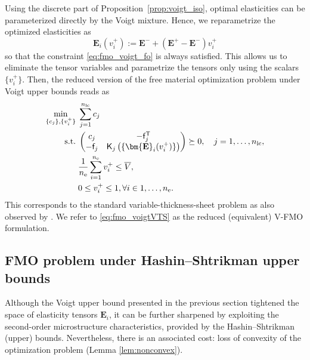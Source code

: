\documentclass[preprint,3p]{elsarticle}
\newcommand{\tensf}[1]{\bm{\mathbf{#1}}}            %
\newcommand{\trn}{\mathsf{T}}                       %
\newcommand{\Ei}{\tensf{E}_i}                       %
\newcommand{\Emin}{\tensf{E}^{-}}                   %
\newcommand{\Emax}{\tensf{E}^{+}}                   %
\newcommand{\nel}{n_\mathrm{e}}                     %
\newcommand{\nlc}{n_\mathrm{lc}}                    %
\newcommand{\semtrx}[1]{\ifcat\noexpand#1\relax\bm{#1}\else\mathsf{#1}\fi}
\newcommand{\sevek}[1]{\ifcat\noexpand#1\relax\bm{#1}\else\mathsf{#1}\fi}
\begin{document}
Using the discrete part of Proposition~\ref{prop:voigt_iso}, optimal elasticities can be parameterized directly by the Voigt mixture. Hence, we reparametrize the optimized elasticities as
%
\begin{equation}
    \Ei (v_i^+) := \Emin + (\Emax - \Emin) v_i^+
\end{equation}
%
so that the constraint \eqref{eq:fmo_voigt_fo} is always satisfied. This allows us to eliminate the tensor variables and parametrize the tensors only using the scalars $\{v_i^+\}$. Then, the reduced version of the free material optimization problem under Voigt upper bounds reads as
%
\begin{subequations}\label{eq:fmo_voigtVTS}
\begin{align}
    \min_{\{c_j\}, \{v_i^+\}} \; & \sum_{j=1}^{\nlc} c_j \label{eq:fmo_voigtVTS_compliance}\\
    \mathrm{s.t.}\; & \begin{pmatrix}
        c_j & -\sevek{f}_j^\trn\\
        -\sevek{f}_j & \semtrx{K}_j\left(\{\Ei(v_i^+)\}\right)
    \end{pmatrix}\succeq 0, \quad j = 1,\dots,\nlc,\label{eq:fmo_voigtVTS_lmi}\\
    & \frac{1}{\nel}\sum_{i=1}^{\nel} v_i^+ \le \overline{V},\label{eq:fmo_voigtVTS_volume}\\
    & 0 \le v_i^+ \le 1, \forall i \in 1,\dots,\nel.
\end{align}
\end{subequations}
%
This corresponds to the standard variable-thickness-sheet problem \citep{Rossow1973} as also observed by \citet{Bendsoe1999}. We refer to \eqref{eq:fmo_voigtVTS} as the reduced (equivalent) V-FMO formulation.




\subsection{FMO problem under Hashin--Shtrikman upper bounds}\label{sec:fmo_hashin}

Although the Voigt upper bound presented in the previous section tightened the space of elasticity tensors $\Ei$, it can be further sharpened by exploiting the second-order microstructure characteristics, provided by the Hashin--Shtrikman (upper) bounds. Nevertheless, there is an associated cost: loss of convexity of the optimization problem (Lemma \ref{lem:nonconvex}).
\end{document}
